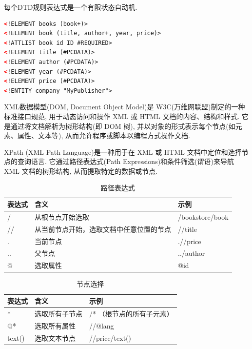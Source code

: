 每个DTD规则表达式是一个有限状态自动机.
\begin{lstlisting}[language=XML]
<!ELEMENT books (book+)>
<!ELEMENT book (title, author+, year, price)>
<!ATTLIST book id ID #REQUIRED>
<!ELEMENT title (#PCDATA)>
<!ELEMENT author (#PCDATA)>
<!ELEMENT year (#PCDATA)>
<!ELEMENT price (#PCDATA)>
<!ENTITY company "MyPublisher">
\end{lstlisting}

XML数据模型(DOM, Document Object Model)是 W3C(万维网联盟)制定的一种标准接口规范, 
用于动态访问和操作 XML 或 HTML 文档的内容、结构和样式. 
它是通过将文档解析为树形结构(即 DOM 树), 并以对象的形式表示每个节点(如元素、属性、文本等), 
从而允许程序或脚本以编程方式操作文档.

XPath (XML Path Language)是一种用于在 XML 或 HTML 文档中定位和选择节点的查询语言.
它通过路径表达式(Path Expressions)和条件筛选(谓语)来导航 XML 文档的树形结构, 
从而提取特定的数据或节点.


\begin{table}[H]
    \centering
    \begin{tabular}{|l|l|l|}
    \hline
    \textbf{表达式} & \textbf{含义} & \textbf{示例} \\
    \hline
    / & 从根节点开始选取 & /bookstore/book \\
    \hline
    // & 从当前节点开始，选取文档中任意位置的节点 & //title \\
    \hline
    . & 当前节点 & .//price \\
    \hline
    .. & 父节点 & ../author \\
    \hline
    @ & 选取属性 & @id \\
    \hline
    \end{tabular}
    \caption{路径表达式}
\end{table}

\begin{table}[H]
    \centering
    \begin{tabular}{|l|l|l|}
    \hline
    \textbf{表达式} & \textbf{含义} & \textbf{示例} \\
    \hline
    * & 选取所有子节点 & /* （根节点的所有子元素） \\
    \hline
    @* & 选取所有属性 & //@lang \\
    \hline
    text() & 选取文本节点 & //price/text() \\
    \hline
    \end{tabular}
    \caption{节点选择}
\end{table}

